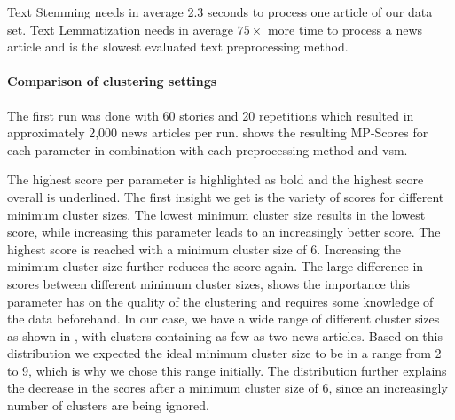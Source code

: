 Text Stemming needs in average 2.3 seconds to process one article of our data set.
Text Lemmatization needs in average $75\times$ more time to process a news article and is
the slowest evaluated text preprocessing method.

\paragraph{Comparison of clustering settings}
The first run was done with 60 stories and 20 repetitions which resulted in approximately 2,000 news articles per run.
 shows the resulting MP-Scores for each parameter
in combination with each preprocessing method and \Gls{vsm}.

The highest score per parameter is highlighted as bold and the highest score overall is underlined.
The first insight we get is the variety of scores for different minimum cluster sizes.
The lowest minimum cluster size results in the lowest score,
while increasing this parameter leads to an increasingly better score.
The highest score is reached with a minimum cluster size of 6.
Increasing the minimum cluster size further reduces the score again.
The large difference in scores between different minimum cluster sizes,
shows the importance this parameter has on the quality of the clustering
and requires some knowledge of the data beforehand.
In our case, we have a wide range of different cluster sizes as shown in ,
with clusters containing as few as two news articles.
Based on this distribution we expected the ideal minimum cluster size to be in a range from 2 to 9,
which is why we chose this range initially.
The distribution further explains the decrease in the scores after a minimum cluster size of 6,
since an increasingly number of clusters are being ignored.

